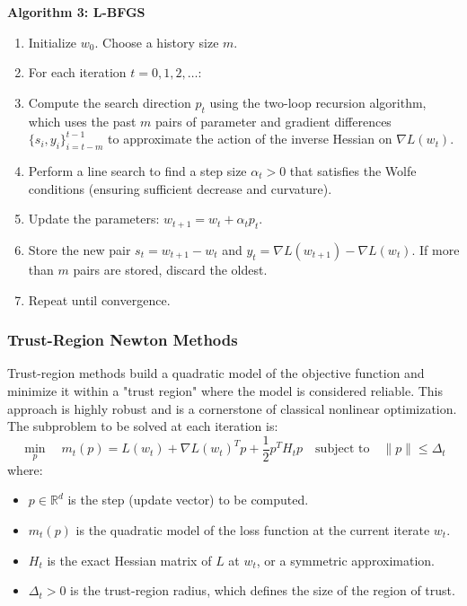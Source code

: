 \documentclass[20pt]{article}
\begin{document}
\textbf{Algorithm 3: L-BFGS}
\begin{enumerate}
    \item Initialize $w_0$. Choose a history size $m$.
    \item For each iteration $t = 0, 1, 2, \dots$:
    \item \quad Compute the search direction $p_t$ using the two-loop recursion algorithm, which uses the past $m$ pairs of parameter and gradient differences $\{s_i, y_i\}_{i=t-m}^{t-1}$ to approximate the action of the inverse Hessian on $\nabla L(w_t)$.
    \item \quad Perform a line search to find a step size $\alpha_t > 0$ that satisfies the Wolfe conditions (ensuring sufficient decrease and curvature).
    \item \quad Update the parameters: $w_{t+1} = w_t + \alpha_t p_t$.
    \item \quad Store the new pair $s_t = w_{t+1} - w_t$ and $y_t = \nabla L(w_{t+1}) - \nabla L(w_t)$. If more than $m$ pairs are stored, discard the oldest.
    \item Repeat until convergence.
\end{enumerate}

\subsubsection{Trust-Region Newton Methods}
Trust-region methods build a quadratic model of the objective function and minimize it within a "trust region" where the model is considered reliable. This approach is highly robust and is a cornerstone of classical nonlinear optimization. The subproblem to be solved at each iteration is:
{\small
\begin{equation}
\min_{p} \quad m_t(p) = L(w_t) + \nabla L(w_t)^T p + \frac{1}{2} p^T H_t p \quad \text{subject to} \quad \|p\| \le \Delta_t
\end{equation}
}
where:
\begin{itemize}
    \item $p \in \mathbb{R}^d$ is the step (update vector) to be computed.
    \item $m_t(p)$ is the quadratic model of the loss function at the current iterate $w_t$.
    \item $H_t$ is the exact Hessian matrix of $L$ at $w_t$, or a symmetric approximation.
    \item $\Delta_t > 0$ is the trust-region radius, which defines the size of the region of trust.
\end{itemize}
\end{document}
